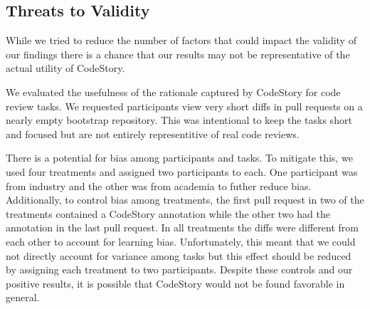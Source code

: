 \documentclass[../manifest.tex]{subfiles}
\begin{document}
\subsection{Threats to Validity} \label{eval-threats}
While we tried to reduce the number of factors that could impact the validity of our findings there is a chance that our results may not be representative of the actual utility of CodeStory.

We evaluated the usefulness of the rationale captured by CodeStory for code review tasks. We requested participants view very short diffs in pull requests on a nearly empty bootstrap repository. This was intentional to keep the tasks short and focused but are not entirely representitive of real code reviews.

There is a potential for bias among participants and tasks. To mitigate this, we used four treatments and assigned two participants to each. One participant was from industry and the other was from academia to futher reduce bias. Additionally, to control bias among treatments, the first pull request in two of the treatments contained a CodeStory annotation while the other two had the annotation in the last pull request. In all treatments the diffs were different from each other to account for learning bias. Unfortunately, this meant that we could not directly account for variance among tasks but this effect should be reduced by assigning each treatment to two participants. Despite these controls and our positive results, it is possible that CodeStory would not be found favorable in general.



\end{document}
